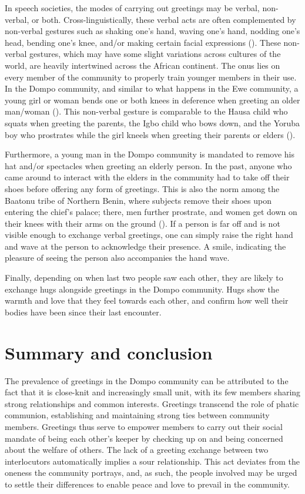 \documentclass[output=paper,colorlinks,citecolor=brown]{langscibook}
\begin{document}
In speech societies, the modes of carrying out greetings may be verbal, non-verbal, or both. Cross-linguistically, these verbal acts are often complemented by non-verbal gestures such as shaking one's hand, waving one's hand, nodding one's head, bending one's knee, and/or making certain facial expressions (\cite{Agyekum2008, Dzameshie2002, Egblewogbe1990, Nwoye1993}). These non-verbal gestures, which may have some slight variations across cultures of the world, are heavily intertwined across the African continent. The onus lies on  every member of the community to properly train younger members in their use. In the Dompo community, and similar to what happens in the Ewe community, a young girl or woman bends one or both knees in deference when greeting an older man/woman (\cite{Egblewogbe1990, Manu-Barfo2020}). This non-verbal gesture is comparable to the Hausa child who squats when greeting the parents, the Igbo child who bows down, and the Yoruba boy who prostrates while the girl kneels when greeting their parents or elders (\cite{Schleicher1997}). 

Furthermore, a young man in the Dompo community is mandated to remove his hat and/or spectacles when greeting an elderly person. In the past, anyone who came around to interact with the elders in the community had to take off their shoes before offering any form of greetings. This is also the norm among the Baatonu tribe of Northern Benin, where subjects remove their shoes upon entering the chief’s palace; there, men further prostrate, and women get down on their knees with their arms on the ground (\cite{Schottman1995}). If a person is far off and is not visible enough to exchange verbal greetings, one can simply raise the right hand and wave at the person to acknowledge their presence. A smile, indicating the pleasure of seeing the person also accompanies the hand wave. 

Finally, depending on when last two people saw each other, they are likely to exchange hugs alongside greetings in the Dompo community. Hugs show the warmth and love that they feel towards each other, and confirm how well their bodies have been since their last encounter.  


\section{Summary and conclusion}

The prevalence of greetings in the Dompo community can be attributed to the fact that it is close-knit and increasingly small unit, with its few members sharing strong relationships and common interests. Greetings transcend the role of phatic communion, establishing and maintaining strong ties between community members. Greetings thus serve to empower members to carry out their social mandate of being each other’s keeper by checking up on and being concerned about the welfare of others. The lack of a greeting exchange between two interlocutors automatically implies a sour relationship. This act deviates from the oneness the community portrays, and, as such, the people involved may be urged to settle their differences to enable peace and love to prevail in the community. 
\end{document}
